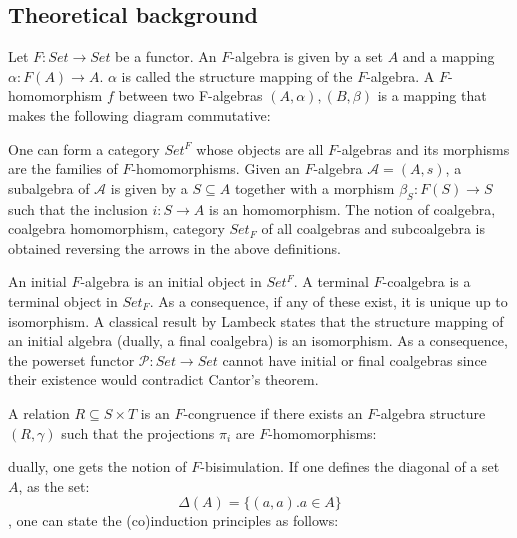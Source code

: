 \documentclass[notitlepage]{article}
\begin{document}
\subsection{Theoretical background}

Let $F: Set \to Set$ be a functor. An $F$-algebra is given by a set $A$ and a mapping $\alpha: F(A) \to A$. $\alpha$ is called the structure mapping of the $F$-algebra. A $F$-homomorphism $f$ between two F-algebras $(A,\alpha),(B,\beta)$ is a mapping that makes the following diagram commutative:


One can form a category $Set^F$ whose objects are all $F$-algebras and its morphisms are the families of $F$-homomorphisms. Given an $F$-algebra $\mathcal{A} = (A,s)$, a subalgebra of $\mathcal{A}$ is given by a $S \subseteq A$ together with a morphism $\beta_S:F(S) \to S$ such that the inclusion $i: S \to A$ is an homomorphism. The notion of coalgebra, coalgebra homomorphism, category $Set_F$ of all coalgebras and subcoalgebra is obtained reversing the arrows in the above definitions. 

An initial $F$-algebra is an initial object in $Set^F$. A terminal $F$-coalgebra is a terminal object in $Set_F$. As a consequence, if any of these exist, it is unique up to isomorphism. A classical result by Lambeck states that the structure mapping of an initial algebra (dually, a final coalgebra) is an isomorphism. As a consequence, the powerset functor $\mathcal{P}: Set \to Set$ cannot have initial or final coalgebras since their existence would contradict Cantor's theorem. 
	
A relation $R \subseteq S \times T$ is an $F$-congruence if there exists an $F$-algebra structure $(R,\gamma)$ such that the projections $\pi_i$ are $F$-homomorphisms:
	

dually, one gets the notion of $F$-bisimulation. If one defines the diagonal of a set $A$, as the set: \[\Delta(A) = \{(a,a). a \in A\}\], one can state the (co)induction principles as follows:
\end{document}
